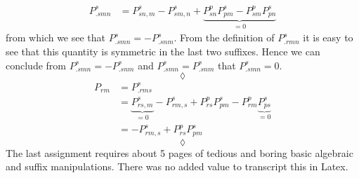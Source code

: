 \begin{align}
P^s_{.smn}&=P^s_{sn,m}-P^s_{sm,n}+\underbrace{P^p_{sn}P^s_{pm}-P^p_{sm}P^s_{pn} }_{=0}
\end{align}
from which we see that $P^s_{.smn}=-P^s_{.snm}$. From the definition of $P^s_{.rmn}$ it is easy to see that this quantity is symmetric in the last two suffixes.
Hence we can conclude from $P^s_{.smn}=-P^s_{.snm}$ and $P^s_{.smn}=P^s_{.snm}$ that $P^s_{.smn}=0$.
$$\lozenge$$
\begin{align}
P_{rm}&=P^s_{.rms}\\
&=\underbrace{P^s_{rs,m}}_{=0}-P^s_{rm,s}+P^p_{rs}P^s_{pm}-P^p_{rm}\underbrace{P^s_{ps} }_{=0}\\
&=-P^s_{rm,s}+P^p_{rs}P^s_{pm}
\end{align}
$$\lozenge$$
The last assignment requires about 5 pages of tedious and boring basic algebraic and suffix manipulations. There was no added value to transcript this in Latex.
